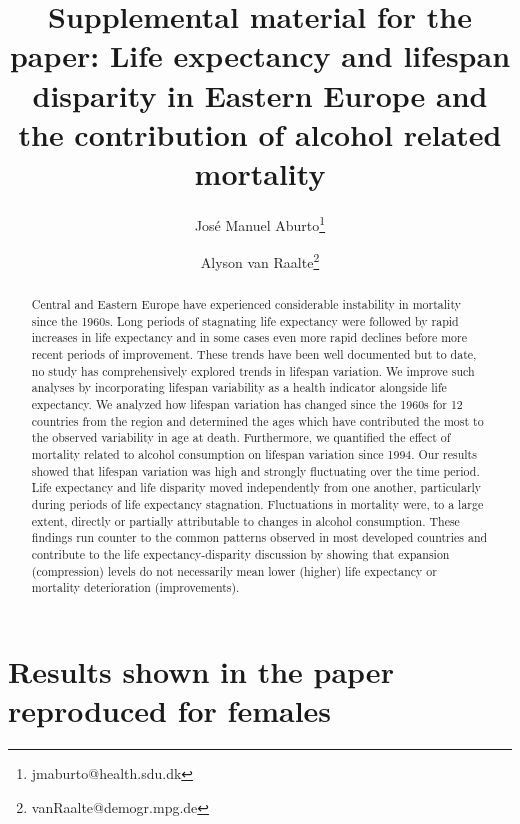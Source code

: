 \documentclass{article}
\title{Supplemental material for the paper: Life expectancy and lifespan disparity in Eastern Europe and the contribution of alcohol related mortality}
\author[1]{Jos\'e Manuel Aburto\thanks{jmaburto@health.sdu.dk}}
\author[2]{Alyson van Raalte\thanks{vanRaalte@demogr.mpg.de}}
\affil[1]{University of Southern Denmark}
\affil[2]{Max Planck Institute for Demographic Research}
\begin{document}
\maketitle

\begin{abstract}
Central and Eastern Europe have experienced considerable instability in mortality since the 1960s. Long periods of stagnating life expectancy were followed by rapid increases in life expectancy and in some cases even more rapid declines before more recent periods of improvement. These trends have been well documented but to date, no study has comprehensively explored trends in lifespan variation.  We improve such analyses by incorporating lifespan variability as a health indicator alongside life expectancy. We analyzed how lifespan variation has changed since the 1960s for 12 countries from the region and determined the ages which have contributed the most to the observed variability in age at death. Furthermore, we quantified the effect of mortality related to alcohol consumption on lifespan variation since 1994. Our results showed that lifespan variation was high and strongly fluctuating over the time period. Life expectancy and life disparity moved independently from one another, particularly during periods of life expectancy stagnation. Fluctuations in mortality were, to a large extent, directly or partially attributable to changes in alcohol consumption. These findings run counter to the common patterns observed in most developed countries and contribute to the life expectancy-disparity discussion by showing that expansion (compression) levels do not necessarily mean lower (higher) life expectancy or mortality deterioration (improvements). 
\end{abstract}


\newpage


\section*{Results shown in the paper reproduced for females}
\end{document}
